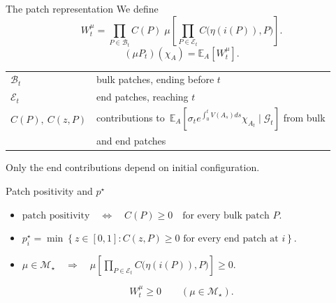 \documentclass[t,aspectratio=169,11pt]{beamer}
\newcommand{\E}{\mathbb E}
\newcommand{\Mstar}{\mathcal M_\star}
\newcommand{\Cb}[1]{\left[#1\right]}
\newcommand{\cb}[1]{\left\{#1\right\}}
\newenvironment{talkpoints}{\begin{itemize}\setlength{\itemsep}{.65em}}{\end{itemize}}
\begin{document}
\begin{frame}[label=patches-representation]{The patch representation}
We define
\begin{equation*}
\boxed{\displaystyle
W_t^\mu
=\prod_{P\in\mathcal B_t}C(P)\;
\mu\!\left[\prod_{P\in\mathcal E_t}C\bigl(\eta(i(P)),P\bigr)\right].}
\end{equation*}
\begin{equation*}
(\mu P_t)(\chi_A)=\E_A[W_t^\mu].
\end{equation*}
\bigskip
\begin{tabular}{@{}ll@{}}
$\mathcal B_t$ & bulk patches, ending before $t$\\[2mm]
$\mathcal E_t$ & end patches, reaching $t$\\[2mm]
$C(P),\ C(z,P)$ & contributions to~$\E_A\Cb{\sigma_t e^{\int_0^t V(A_s)ds}\chi_{A_t}\mid\mathcal{G}_t}$ from bulk\\
& and end patches
\end{tabular}
\bigskip
\begin{center}
Only the end contributions depend on initial configuration.
\end{center}
\note{\PatchesRepresentationScript}
\end{frame}

\begin{frame}[label=proof-positivity]{\texorpdfstring{Patch positivity and $p^\star$}{Patch positivity and the density profile}}
\begin{talkpoints}
\item $\displaystyle\text{patch positivity}\quad\Longleftrightarrow\quad C(P)\geq0
\quad\text{for every bulk patch }P.$
\item $\displaystyle p_i^\star
=\min\cb{z\in[0,1]:C(z,P)\geq0\text{ for every end patch at }i}.$
\item $\displaystyle\mu\in\Mstar\quad\Longrightarrow\quad
\mu\!\left[\prod_{P\in\mathcal E_t}C\bigl(\eta(i(P)),P\bigr)\right]\geq0.$
\end{talkpoints}
\medskip
\begin{equation*}
\boxed{W_t^\mu\geq0\qquad(\mu\in\Mstar).}
\end{equation*}
\note{\ProofPositivityScript}
\end{frame}
\end{document}
